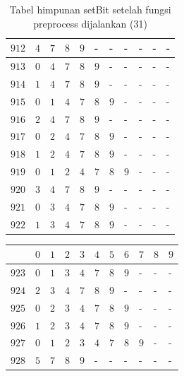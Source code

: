 \begin{appendices}
\begin{table}[H]
\begin{tabular} {|l|l|l|l|l|l|l|l|l|l|l|}
  		$ 912 $ & $ 4 $ &$ 7 $ &$ 8 $ &$ 9 $ & - &  - &  - &  - &  - &  -   \\ \hline
  		$ 913 $ & $ 0 $ &$ 4 $ &$ 7 $ &$ 8 $ &$ 9 $ & - &  - &  - &  - &  -   \\ \hline
  		$ 914 $ & $ 1 $ &$ 4 $ &$ 7 $ &$ 8 $ &$ 9 $ & - &  - &  - &  - &  -   \\ \hline
  		$ 915 $ & $ 0 $ &$ 1 $ &$ 4 $ &$ 7 $ &$ 8 $ &$ 9 $ & - &  - &  - &  -   \\ \hline
  		$ 916 $ & $ 2 $ &$ 4 $ &$ 7 $ &$ 8 $ &$ 9 $ & - &  - &  - &  - &  -   \\ \hline
  		$ 917 $ & $ 0 $ &$ 2 $ &$ 4 $ &$ 7 $ &$ 8 $ &$ 9 $ & - &  - &  - &  -   \\ \hline
  		$ 918 $ & $ 1 $ &$ 2 $ &$ 4 $ &$ 7 $ &$ 8 $ &$ 9 $ & - &  - &  - &  -   \\ \hline
  		$ 919 $ & $ 0 $ &$ 1 $ &$ 2 $ &$ 4 $ &$ 7 $ &$ 8 $ &$ 9 $ & - &  - &  -   \\ \hline
  		$ 920 $ & $ 3 $ &$ 4 $ &$ 7 $ &$ 8 $ &$ 9 $ & - &  - &  - &  - &  -   \\ \hline
  		$ 921 $ & $ 0 $ &$ 3 $ &$ 4 $ &$ 7 $ &$ 8 $ &$ 9 $ & - &  - &  - &  -   \\ \hline
  		$ 922 $ & $ 1 $ &$ 3 $ &$ 4 $ &$ 7 $ &$ 8 $ &$ 9 $ & - &  - &  - &  -   \\ \hline
  	\end{tabular}\caption{Tabel himpunan setBit setelah fungsi preprocess dijalankan (31)}
  	\label{tab:setbit_31}
  \end{table}
  \begin{table}[H]
  	\centering
  	\begin{tabular} {|l|l|l|l|l|l|l|l|l|l|l|} \hline
  		\backslashbox{$Num$}{$index$} & $ 0 $ & $ 1 $ & $ 2 $ & $ 3 $ & $ 4 $ & $ 5 $ & $ 6 $ & $ 7 $ & $ 8 $ & $ 9 $ \\ \hline
  		$ 923 $ & $ 0 $ &$ 1 $ &$ 3 $ &$ 4 $ &$ 7 $ &$ 8 $ &$ 9 $ & - &  - &  -   \\ \hline
  		$ 924 $ & $ 2 $ &$ 3 $ &$ 4 $ &$ 7 $ &$ 8 $ &$ 9 $ & - &  - &  - &  -   \\ \hline
  		$ 925 $ & $ 0 $ &$ 2 $ &$ 3 $ &$ 4 $ &$ 7 $ &$ 8 $ &$ 9 $ & - &  - &  -   \\ \hline
  		$ 926 $ & $ 1 $ &$ 2 $ &$ 3 $ &$ 4 $ &$ 7 $ &$ 8 $ &$ 9 $ & - &  - &  -   \\ \hline
  		$ 927 $ & $ 0 $ &$ 1 $ &$ 2 $ &$ 3 $ &$ 4 $ &$ 7 $ &$ 8 $ &$ 9 $ & - &  -   \\ \hline
  		$ 928 $ & $ 5 $ &$ 7 $ &$ 8 $ &$ 9 $ & - &  - &  - &  - &  - &  -   \\ \hline

\end{tabular}
\end{table}
\end{appendices}
